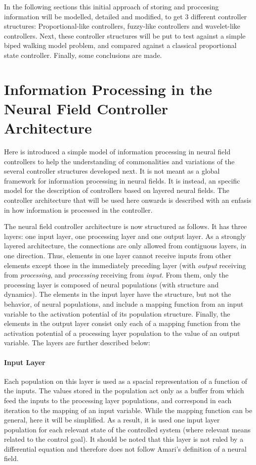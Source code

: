 In the following sections this initial approach of storing and
proccesing information will be modelled, detailed and modified, to get
3 different controller structures: Proportional-like controllers,
fuzzy-like controllers and wavelet-like controllers. Next, these
controller structures will be put to test against a simple biped
walking model problem, and compared against a classical proportional
state controller. Finally, some conclusions are made.

\section{Information Processing in the Neural Field
  Controller Architecture}
\label{sec:fuzzy-control}

Here is introduced a simple model of information processing in neural
field controllers to help the understanding of commonalities and
variations of the several controller structures developed next. It is
not meant as a global framework for information processing in neural
fields. It is instead, an specific model for the description of
controllers based on layered neural fields. The controller
architecture that will be used here onwards is described with an
enfasis in how information is processed in the controller.

The neural field controller architecture is now structured as
follows. It has three layers: one input layer, one processing layer
and one output layer. As a strongly layered architecture, the
connections are only allowed from contiguous layers, in one
direction. Thus, elements in one layer cannot receive inputs from
other elements except those in the immediately preceding layer (with
\emph{output} receiving from \emph{processing}, and \emph{processing}
receiving from \emph{input}. From them, only the processing layer is
composed of neural populations (with structure and dynamics). The
elements in the input layer have the structure, but not the behavior,
of neural populations, and include a mapping function from an input
variable to the activation potential of its population
structure. Finally, the elements in the output layer consist only each
of a mapping function from the activation potential of a processing
layer population to the value of an output variable. The layers are
further described below:

\paragraph{Input Layer}
Each population on this layer is used as a spacial representation of a
function of the inputs. The values stored in the population act only
as a buffer from which feed the inputs to the processing layer
populations, and correspond in each iteration to the mapping of an
input variable. While the mapping function can be general, here it
will be simplified. As a result, it is used one input layer population
for each relevant state of the controlled system (where relevant means
related to the control goal). It should be noted that this layer is
not ruled by a differential equation and therefore does not follow
Amari's definition of a neural field.

